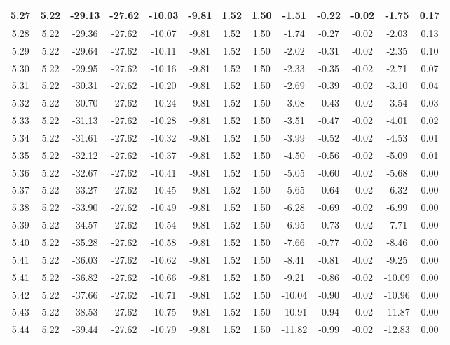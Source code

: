 \begin{table}[htbp]
\begin{adjustbox}{angle=90}
\begin{tabular}{|c|c|c|c|c|c|c|c|c|c|c|c|c|}
 5.27 & 5.22 & -29.13 & -27.62 & -10.03 & -9.81 & 1.52 & 1.50 & -1.51 & -0.22 & -0.02 & -1.75 & 0.17\\ \hline
 5.28 & 5.22 & -29.36 & -27.62 & -10.07 & -9.81 & 1.52 & 1.50 & -1.74 & -0.27 & -0.02 & -2.03 & 0.13\\ \hline
 5.29 & 5.22 & -29.64 & -27.62 & -10.11 & -9.81 & 1.52 & 1.50 & -2.02 & -0.31 & -0.02 & -2.35 & 0.10\\ \hline
 5.30 & 5.22 & -29.95 & -27.62 & -10.16 & -9.81 & 1.52 & 1.50 & -2.33 & -0.35 & -0.02 & -2.71 & 0.07\\ \hline
 5.31 & 5.22 & -30.31 & -27.62 & -10.20 & -9.81 & 1.52 & 1.50 & -2.69 & -0.39 & -0.02 & -3.10 & 0.04\\ \hline
 5.32 & 5.22 & -30.70 & -27.62 & -10.24 & -9.81 & 1.52 & 1.50 & -3.08 & -0.43 & -0.02 & -3.54 & 0.03\\ \hline
 5.33 & 5.22 & -31.13 & -27.62 & -10.28 & -9.81 & 1.52 & 1.50 & -3.51 & -0.47 & -0.02 & -4.01 & 0.02\\ \hline
 5.34 & 5.22 & -31.61 & -27.62 & -10.32 & -9.81 & 1.52 & 1.50 & -3.99 & -0.52 & -0.02 & -4.53 & 0.01\\ \hline
 5.35 & 5.22 & -32.12 & -27.62 & -10.37 & -9.81 & 1.52 & 1.50 & -4.50 & -0.56 & -0.02 & -5.09 & 0.01\\ \hline
 5.36 & 5.22 & -32.67 & -27.62 & -10.41 & -9.81 & 1.52 & 1.50 & -5.05 & -0.60 & -0.02 & -5.68 & 0.00\\ \hline
 5.37 & 5.22 & -33.27 & -27.62 & -10.45 & -9.81 & 1.52 & 1.50 & -5.65 & -0.64 & -0.02 & -6.32 & 0.00\\ \hline
 5.38 & 5.22 & -33.90 & -27.62 & -10.49 & -9.81 & 1.52 & 1.50 & -6.28 & -0.69 & -0.02 & -6.99 & 0.00\\ \hline
 5.39 & 5.22 & -34.57 & -27.62 & -10.54 & -9.81 & 1.52 & 1.50 & -6.95 & -0.73 & -0.02 & -7.71 & 0.00\\ \hline
 5.40 & 5.22 & -35.28 & -27.62 & -10.58 & -9.81 & 1.52 & 1.50 & -7.66 & -0.77 & -0.02 & -8.46 & 0.00\\ \hline
 5.41 & 5.22 & -36.03 & -27.62 & -10.62 & -9.81 & 1.52 & 1.50 & -8.41 & -0.81 & -0.02 & -9.25 & 0.00\\ \hline
 5.41 & 5.22 & -36.82 & -27.62 & -10.66 & -9.81 & 1.52 & 1.50 & -9.21 & -0.86 & -0.02 & -10.09 & 0.00\\ \hline
 5.42 & 5.22 & -37.66 & -27.62 & -10.71 & -9.81 & 1.52 & 1.50 & -10.04 & -0.90 & -0.02 & -10.96 & 0.00\\ \hline
 5.43 & 5.22 & -38.53 & -27.62 & -10.75 & -9.81 & 1.52 & 1.50 & -10.91 & -0.94 & -0.02 & -11.87 & 0.00\\ \hline
 5.44 & 5.22 & -39.44 & -27.62 & -10.79 & -9.81 & 1.52 & 1.50 & -11.82 & -0.99 & -0.02 & -12.83 & 0.00\\ \hline
            \end{tabular}
        \end{adjustbox}
        \caption{}
        \label{}
    \end{table}
    